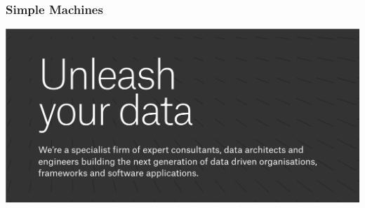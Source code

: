 \begin{frame}
\frametitle{Simple Machines}
\includegraphics[keepaspectratio=true,width=0.7\paperwidth]{image/unleash-your-data.png}
\end{frame}
